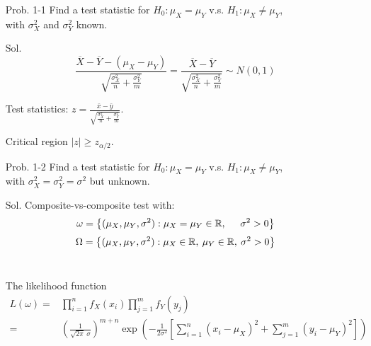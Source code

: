 \begin{frame}
\begin{enumerate}
	\item[Prob. 1-1] Find a test statistic for $H_0 : \mu_X = \mu_Y$ v.s. $H_1 : \mu_X \ne \mu_Y$, \\[1em]
	with $\sigma^2_X$ and $\sigma^2_Y$ known.\\[2em]
	\vfill
	\item[Sol.]
	\[
		\frac{\overline{X}-\overline{Y}-(\mu_X-\mu_Y)}{\sqrt{\frac{\sigma_X^2}{n}+\frac{\sigma_Y^2}{m} }} =
		\frac{\overline{X}-\overline{Y}}{\sqrt{\frac{\sigma_X^2}{n}+\frac{\sigma_Y^2}{m} }} \sim N(0,1)
	\]
	\vfill
	\item[] Test statistics: $z = \frac{\bar{x}-\bar{y}}{\sqrt{\frac{\sigma_X^2}{n}+\frac{\sigma_Y^2}{m} }}$.
	\vfill
	\item[] Critical region $|z|\ge z_{\alpha/2}$. \myEnd
\end{enumerate}
\end{frame}
\begin{frame}
\begin{enumerate}
	\item[Prob. 1-2] Find a test statistic for $H_0 : \mu_X = \mu_Y$ v.s. $H_1 : \mu_X \ne \mu_Y$, \\[1em]
		with $\sigma^2_X = \sigma^2_Y=\sigma^2$ but unknown.\\[2em]
\vfill
\item[Sol.] Composite-vs-composite test with:
\[\omega =\left\{(\mu_X,\mu_Y,\sigma^2): \mu_X=\mu_Y\in\mathbb{R}, \hspace{1.4em} \sigma^2>0\right\}\]
\[\Omega =\left\{(\mu_X,\mu_Y,\sigma^2): \mu_X\in\mathbb{R},\: \mu_Y\in\mathbb{R}, \: \sigma^2>0\right\}\]\\[2em]
\item[] The likelihood function
	\begin{align*}
		L(\omega)= & \prod_{i=1}^n f_X(x_i) \prod_{j=1}^mf_Y(y_j)\\[2em]
		=&\left(  \frac{1}{\sqrt{2\pi}\:\sigma} \right)^{m+n}\exp \left(
	- \frac{1}{2\sigma^2} \left[\sum_{i=1}^n (x_i-\mu_X)^2 + \sum_{j=1}^m (y_i-\mu_Y)^2
	\right]
\right)
	\end{align*}
\end{enumerate}
\end{frame}
